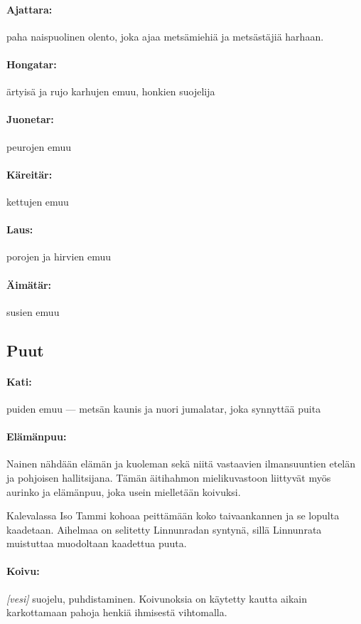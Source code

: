   \paragraph{Ajattara:} paha naispuolinen olento, joka ajaa metsämiehiä ja metsästäjiä harhaan.
  \paragraph{Hongatar:} ärtyisä ja rujo karhujen emuu, honkien suojelija
  \paragraph{Juonetar:} peurojen emuu
  \paragraph{Käreitär:} kettujen emuu
  \paragraph{Laus:} porojen ja hirvien emuu
  \paragraph{Äimätär:} susien emuu


\subsection{Puut}

  \paragraph{Kati:} puiden emuu --- metsän kaunis ja nuori jumalatar, joka synnyttää puita
  \paragraph{Elämänpuu:} Nainen nähdään elämän ja kuoleman sekä niitä vastaavien ilmansuuntien
    etelän ja pohjoisen hallitsijana. Tämän äitihahmon mielikuvastoon liittyvät myös aurinko ja
    elämänpuu, joka usein mielletään koivuksi.
    \par
    Kalevalassa Iso Tammi kohoaa peittämään koko taivaankannen ja se lopulta kaadetaan. Aihelmaa
    on selitetty Linnunradan syntynä, sillä Linnunrata muistuttaa muodoltaan kaadettua puuta.
  \paragraph{Koivu:} \emph{[vesi]} suojelu, puhdistaminen. Koivunoksia on käytetty kautta aikain
    karkottamaan pahoja henkiä ihmisestä vihtomalla.
